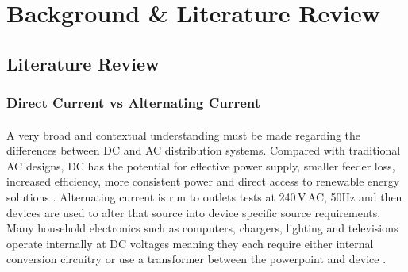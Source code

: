 
\section{Background \& Literature Review}



\subsection{Literature Review}

\subsubsection{Direct Current vs Alternating Current}

\paragraph{}
A very broad and contextual understanding must be made regarding the differences between DC and AC distribution systems. Compared with traditional AC designs, DC has the potential for effective power supply, smaller feeder loss, increased efficiency, more consistent power and direct access to renewable energy solutions \cite{Liu2014}. Alternating current is run to outlets tests at 240\,V\,AC, 50\si{Hz} and then devices are used to alter that source into device specific source requirements. Many household electronics such as computers, chargers, lighting and televisions operate internally at DC voltages meaning they each require either internal conversion circuitry or use a transformer between the powerpoint and device \cite{Paajanen2009}.

